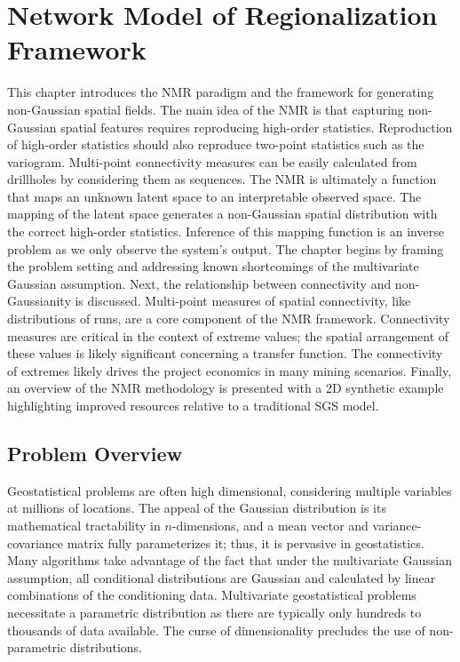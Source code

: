 
\chapter{Network Model of Regionalization Framework}
\label{ch:03framework}

This chapter introduces the \gls{NMR} paradigm and the framework for generating non-Gaussian spatial fields. The main idea of the \gls{NMR} is that capturing non-Gaussian spatial features requires reproducing high-order statistics. Reproduction of high-order statistics should also reproduce two-point statistics such as the variogram. Multi-point connectivity measures can be easily calculated from drillholes by considering them as sequences. The \gls{NMR} is ultimately a function that maps an unknown latent space to an interpretable observed space. The mapping of the latent space generates a non-Gaussian spatial distribution with the correct high-order statistics. Inference of this mapping function is an inverse problem as we only observe the system's output. The chapter begins by framing the problem setting and addressing known shortcomings of the multivariate Gaussian assumption. Next, the relationship between connectivity and non-Gaussianity is discussed. Multi-point measures of spatial connectivity, like distributions of runs, are a core component of the \gls{NMR} framework. Connectivity measures are critical in the context of extreme values; the spatial arrangement of these values is likely significant concerning a transfer function. The connectivity of extremes likely drives the project economics in many mining scenarios. Finally, an overview of the \gls{NMR} methodology is presented with a \gls{2D} synthetic example highlighting improved resources relative to a traditional \gls{SGS} model.


\FloatBarrier
\section{Problem Overview}
\label{sec:03overview}

Geostatistical problems are often high dimensional, considering multiple variables at millions of locations. The appeal of the Gaussian distribution is its mathematical tractability in $n$-dimensions, and a mean vector and variance-covariance matrix fully parameterizes it; thus, it is pervasive in geostatistics. Many algorithms take advantage of the fact that under the multivariate Gaussian assumption, all conditional distributions are Gaussian and calculated by linear combinations of the conditioning data. Multivariate geostatistical problems necessitate a parametric distribution as there are typically only hundreds to thousands of data available. The curse of dimensionality precludes the use of non-parametric distributions.

